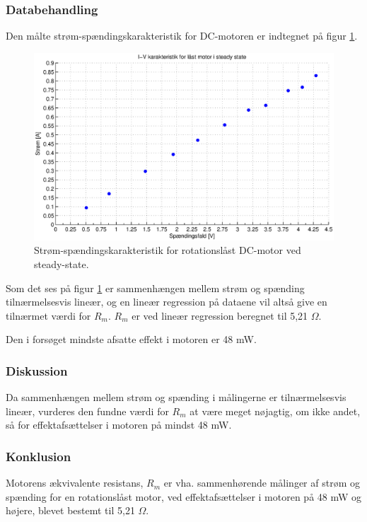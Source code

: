 \subsubsection{Databehandling}
Den målte strøm-spændingskarakteristik for DC-motoren er indtegnet på figur \ref{fig:resistans0}.
\begin{figure}[th!]
	\centering
	\includegraphics[width=1\textwidth]{./graphics/resistans1.eps}
	\caption[Strøm-spændingskarakteristik for rotationslåst DC-motor]{Strøm-spændingskarakteristik for rotationslåst DC-motor ved steady-state.}
	\label{fig:resistans0}
\end{figure}
Som det ses på figur \ref{fig:resistans0} er sammenhængen mellem strøm og spænding
tilnærmelsesvis lineær, og en lineær regression på dataene vil altså give en tilnærmet værdi for $R_m$.
$R_m$ er ved lineær regression beregnet til 5,21 $\Omega$.

Den i forsøget mindste afsatte effekt i motoren er 48 mW.
\subsubsection{Diskussion}
Da sammenhængen mellem strøm og spænding i målingerne er tilnærmelsesvis lineær,
vurderes den fundne værdi for $R_m$ at være meget nøjagtig,
om ikke andet, så for effektafsættelser i motoren på mindst 48 mW.
\subsubsection{Konklusion}
Motorens ækvivalente resistans, $R_m$ er vha. sammenhørende målinger af strøm og spænding
for en rotationslåst motor, ved effektafsættelser i motoren på 48 mW og højere,
blevet bestemt til 5,21 $\Omega$.
